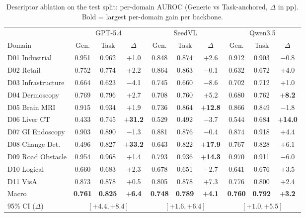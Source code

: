 \begin{table}[h]
\centering
\caption{Descriptor ablation on the test split: per-domain AUROC (Generic vs Task-anchored, $\Delta$ in pp). Bold = largest per-domain gain per backbone.}
\label{tab:descriptor_ablation}
\footnotesize
\setlength{\tabcolsep}{4pt}
\begin{tabular}{lccc|ccc|ccc}
\toprule
& \multicolumn{3}{c|}{GPT-5.4} & \multicolumn{3}{c|}{SeedVL} & \multicolumn{3}{c}{Qwen3.5} \\
Domain & Gen. & Task & $\Delta$ & Gen. & Task & $\Delta$ & Gen. & Task & $\Delta$ \\
\midrule
D01 Industrial      & 0.951 & 0.962 & $+$1.0  & 0.848 & 0.874 & $+$2.6 & 0.912 & 0.903 & $-$0.8 \\
D02 Retail          & 0.752 & 0.774 & $+$2.2  & 0.864 & 0.863 & $-$0.1 & 0.632 & 0.672 & $+$4.0 \\
D03 Infrastructure  & 0.664 & 0.623 & $-$4.1  & 0.745 & 0.660 & $-$8.6 & 0.702 & 0.712 & $+$1.0 \\
D04 Dermoscopy      & 0.769 & 0.796 & $+$2.7  & 0.708 & 0.760 & $+$5.2 & 0.680 & 0.762 & \textbf{$+$8.2} \\
D05 Brain MRI       & 0.915 & 0.934 & $+$1.9  & 0.736 & 0.864 & \textbf{$+$12.8} & 0.866 & 0.849 & $-$1.8 \\
D06 Liver CT        & 0.433 & 0.745 & \textbf{$+$31.2} & 0.529 & 0.492 & $-$3.7 & 0.544 & 0.684 & \textbf{$+$14.0} \\
D07 GI Endoscopy    & 0.903 & 0.890 & $-$1.3  & 0.881 & 0.876 & $-$0.4 & 0.874 & 0.918 & $+$4.4 \\
D08 Change Det.     & 0.496 & 0.827 & \textbf{$+$33.2} & 0.643 & 0.822 & \textbf{$+$17.9} & 0.767 & 0.828 & $+$6.1 \\
D09 Road Obstacle   & 0.954 & 0.968 & $+$1.4  & 0.793 & 0.936 & \textbf{$+$14.3} & 0.970 & 0.911 & $-$6.0 \\
D10 Logical         & 0.660 & 0.683 & $+$2.3  & 0.678 & 0.651 & $-$2.7 & 0.641 & 0.676 & $+$3.5 \\
D11 VisA            & 0.873 & 0.878 & $+$0.5  & 0.805 & 0.878 & $+$7.3 & 0.776 & 0.800 & $+$2.4 \\
\midrule
Macro               & \textbf{0.761} & \textbf{0.825} & \textbf{$+$6.4} &
                      \textbf{0.748} & \textbf{0.789} & \textbf{$+$4.1} &
                      \textbf{0.760} & \textbf{0.792} & \textbf{$+$3.2} \\
95\% CI ($\Delta$)  & \multicolumn{3}{c|}{$[+4.4, +8.4]$} &
                      \multicolumn{3}{c|}{$[+1.6, +6.4]$} &
                      \multicolumn{3}{c}{$[+1.0, +5.5]$} \\
\bottomrule
\end{tabular}
\end{table}

